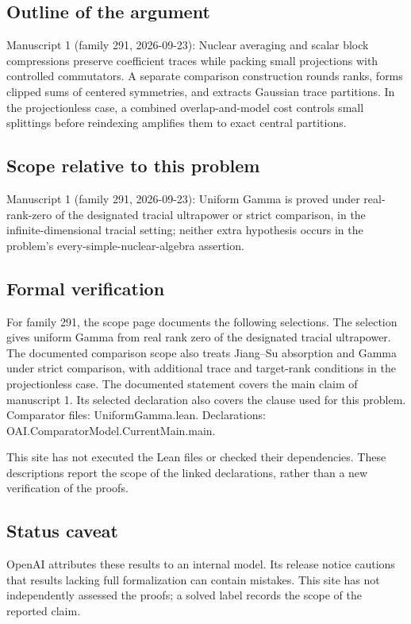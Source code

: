 \documentclass[11pt]{article}
\begin{document}
\subsection{Outline of the argument}
Manuscript 1 (family 291, 2026-09-23): Nuclear averaging and scalar block compressions preserve coefficient traces while packing small projections with controlled commutators. A separate comparison construction rounds ranks, forms clipped sums of centered symmetries, and extracts Gaussian trace partitions. In the projectionless case, a combined overlap-and-model cost controls small splittings before reindexing amplifies them to exact central partitions.

\subsection{Scope relative to this problem}
Manuscript 1 (family 291, 2026-09-23): Uniform Gamma is proved under real-rank-zero of the designated tracial ultrapower or strict comparison, in the infinite-dimensional tracial setting; neither extra hypothesis occurs in the problem’s every-simple-nuclear-algebra assertion.

\subsection{Formal verification}
For family 291, the scope page documents the following selections. The selection gives uniform Gamma from real rank zero of the designated tracial ultrapower. The documented comparison scope also treats Jiang--Su absorption and Gamma under strict comparison, with additional trace and target-rank conditions in the projectionless case. The documented statement covers the main claim of manuscript 1. Its selected declaration also covers the clause used for this problem. Comparator files: UniformGamma.lean. Declarations: OAI.ComparatorModel.CurrentMain.main.

This site has not executed the Lean files or checked their dependencies. These descriptions report the scope of the linked declarations, rather than a new verification of the proofs.

\subsection{Status caveat}
OpenAI attributes these results to an internal model. Its release notice cautions that results lacking full formalization can contain mistakes. This site has not independently assessed the proofs; a solved label records the scope of the reported claim.
\end{document}
